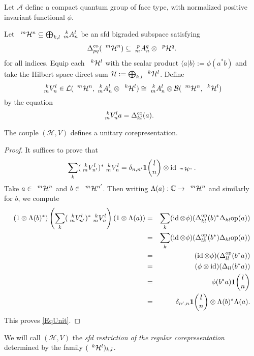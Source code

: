 \begin{Exa} \label{exa:rep-regular}
  Let $\mathscr{A}$ define a compact quantum group of face type, with normalized positive invariant functional $\phi$. 

  Let $\Gru{\mathcal{H}}{m}{n} \subseteq \bigoplus_{k,l}
  \Gr{A}{k}{l}{m}{n}$ be an sfd bigraded subspace satisfying
\begin{align*}
  \Delta^{\co}_{pq}(\Gru{\mathcal{H}}{m}{n}) \subseteq
 \Gr{A}{p}{q}{m}{n} \otimes \Gru{\mathcal{H}}{p}{q}.
\end{align*}
for all indices.
Equip each $\Gru{\mathcal{H}}{k}{l}$ with the scalar product $\langle
a|b\rangle:=\phi(a^{*}b)$ and take the Hilbert space direct sum
$\mathcal{H}:=\bigoplus_{k,l} \Gru{\mathcal{H}}{k}{l}$.
Define \[ \Gr{V}{k}{l}{m}{n} \in \mathcal{L}(\Gru{\mathcal{H}}{m}{n}, \Gr{A}{k}{l}{m}{n} \otimes \Gru{\mathcal{H}}{k}{l}) \cong \Gr{A}{k}{l}{m}{n} \otimes 
\mathcal{B}(\Gru{\mathcal{H}}{m}{n},\Gru{\mathcal{H}}{k}{l})\]  by the
equation
\begin{align*}
  \Gr{V}{k}{l}{m}{n}a &= \Delta^{\co}_{kl}(a).
\end{align*}

\begin{Lem} The couple $(\mathcal{H},V)$ defines a unitary corepresentation. 
\end{Lem} 
\begin{proof} It suffices to prove that \begin{equation}\label{EqUnit} \sum_{k} (\Gr{V}{k}{l}{m}{n'})^* \Gr{V}{k}{l}{m}{n} = \delta_{n,n'}\UnitC{l}{n}\otimes \id_{\Gru{\Hsp}{m}{n}}.\end{equation} Take $a\in \Gru{\Hsp}{m}{n}$ and $b\in \Gru{\Hsp}{m}{n'}$. Then writing $\Lambda(a): \C\rightarrow \Gru{\Hsp}{m}{n}$ and similarly for $b$, we compute \begin{eqnarray*}(1\otimes \Lambda(b)^*)\left(\sum_{k} (\Gr{V}{k}{l}{m}{n'})^* \Gr{V}{k}{l}{m}{n}\right) (1\otimes \Lambda(a)) &=& \sum_k (\id\otimes \phi)(\Delta_{kl}^{\op}(b)^*\Delta_{kl}{\op}(a))\\ &=&  \sum_k (\id\otimes \phi)(\Delta_{lk}^{\op}(b^*)\Delta_{kl}{\op}(a)) \\ &=& (\id\otimes \phi)(\Delta_{ll}^{\op}(b^*a))\\ &=&  (\phi\otimes \id)(\Delta_{ll}(b^*a)) \\ &=& \phi(b^*a)\UnitC{l}{n} \\&=& \delta_{n',n} \UnitC{l}{n} \otimes \Lambda(b)^*\Lambda(a).\end{eqnarray*} 
This proves \eqref{EqUnit}.
\end{proof} 

We will call $(\mathcal{H},V)$  the 
\emph{sfd restriction of the regular corepresentation}
determined by the family $(\Gru{\mathcal{H}}{k}{l})_{k,l}$. 
\end{Exa}

